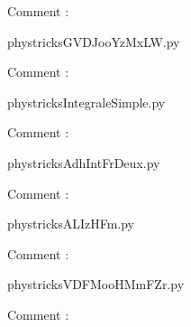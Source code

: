     Comment : 

    \clearpage
    


    \newcommand{\CaptionFigGVDJooYzMxLW}{<+Type your caption here+>}
    \begin{center}
        
    \end{center}
    phystricksGVDJooYzMxLW.py

    Comment : 

    \clearpage
    


    \newcommand{\CaptionFigIntegraleSimple}{<+Type your caption here+>}
    \begin{center}
        
    \end{center}
    phystricksIntegraleSimple.py

    Comment : 

    \clearpage
    


    \newcommand{\CaptionFigAdhIntFrDeux}{<+Type your caption here+>}
    \begin{center}
        
    \end{center}
    phystricksAdhIntFrDeux.py

    Comment : 

    \clearpage
    


    \newcommand{\CaptionFigALIzHFm}{<+Type your caption here+>}
    \begin{center}
        
    \end{center}
    phystricksALIzHFm.py

    Comment : 

    \clearpage
    


    \newcommand{\CaptionFigVDFMooHMmFZr}{<+Type your caption here+>}
    \begin{center}
        
    \end{center}
    phystricksVDFMooHMmFZr.py

    Comment : 

    \clearpage
    


